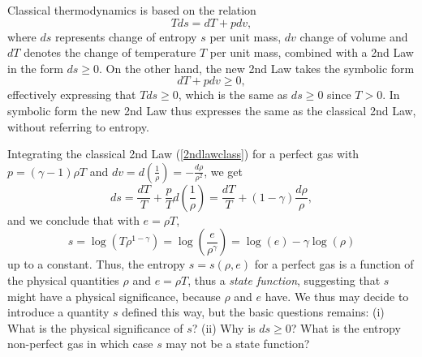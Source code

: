 Classical thermodynamics is based on the relation 
\begin{equation}\label{2ndlawclass}
Tds=dT+pdv, 
\end{equation}
where $ds$ represents change of entropy $s$ per unit mass, $dv$ change
of volume and $dT$ denotes the change of temperature $T$ per unit mass, 
combined with a 2nd Law in the form
$ds\ge 0$. On the other hand, the new 2nd Law takes the symbolic form
\begin{equation}\label{new2ndlawsymb}
dT+pdv\ge 0,
\end{equation}
effectively expressing that $Tds\ge 0$, which is the 
same  as $ds\ge 0$ since $T>0$. In symbolic form the new 2nd Law
thus expresses the same as the classical 2nd Law, without referring 
to entropy.

Integrating the classical 2nd Law
(\ref{2ndlawclass}) for a perfect gas with
$p=(\gamma -1)\rho T$
and $dv=d(\frac{1}{\rho})=-\frac{d\rho}{\rho^2}$, we get
\[
ds=\frac{dT}{T}+\frac{p}{T}d(\frac{1}{\rho})=
\frac{dT}{T}+(1-\gamma )\frac{d\rho}{\rho},
\]
and we conclude that with $e=\rho T$,
\begin{equation}\label{STrho}
s=\log(T\rho^{1-\gamma})=\log(\frac{e}{\rho^{\gamma}})=
\log(e)-\gamma\log(\rho )
\end{equation}
up to a constant. Thus, the entropy $s=s(\rho ,e )$ 
for a perfect gas is a function of the physical quantities 
$\rho$ and $e=\rho T$, thus a \emph{state function}, suggesting  
that $s$ might have a physical significance, because
$\rho$ and $e$ have. We thus may decide to introduce 
a quantity $s$ defined this way, but the basic
questions remains: (i) What is the physical significance of $s$? 
(ii) Why is $ds\ge 0$? What is the
entropy non-perfect gas in which case $s$ may not be a state function? 

